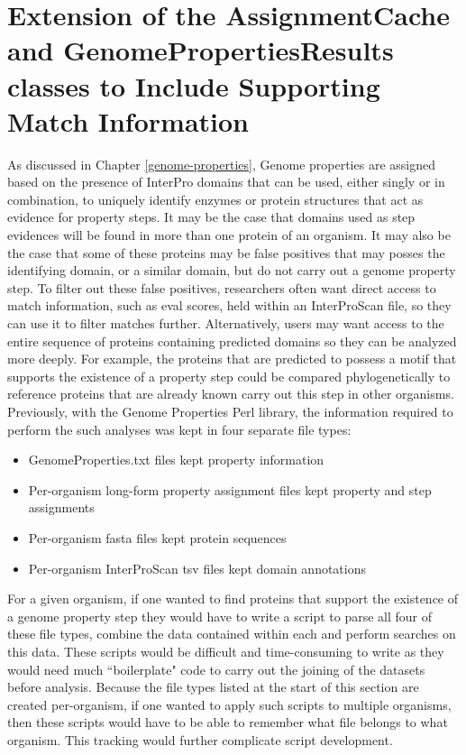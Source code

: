 \section{Extension of the AssignmentCache and GenomePropertiesResults classes to 
Include Supporting Match Information}

As discussed in Chapter \ref{genome-properties}, Genome properties are assigned 
based on the presence of InterPro domains that can be used, either singly or in 
combination, to uniquely identify enzymes or protein structures that act as 
evidence for property steps. It may be the case that domains used as step 
evidences will be found in more than one protein of an organism. It may also be 
the case that some of these proteins may be false positives that may posses the 
identifying domain, or a similar domain, but do not carry out a genome property 
step. To filter out these false positives, researchers often want direct access 
to match information, such as \gls{eval} scores, held within an InterProScan 
file, so they can use it to filter matches further. Alternatively, users may 
want access to the entire sequence of proteins containing predicted domains so 
they can be analyzed more deeply. For example, the proteins that are predicted 
to possess a motif that supports the existence of a property step could be 
compared phylogenetically to reference proteins that are already known carry out 
this step in other organisms. Previously, with the Genome Properties Perl 
library, the information required to perform the such analyses was kept in four 
separate file types:

\begin{itemize}
\item GenomeProperties.txt files kept property information
\item Per-organism long-form property assignment files kept property and step 
assignments
\item Per-organism \gls{fasta} files \cite{pearson19905} kept protein sequences 
\item  Per-organism InterProScan \gls{tsv} files kept domain annotations 
\end{itemize}

For a given organism, if one wanted to find proteins that support the existence 
of a genome property step they would have to write a script to parse all four of 
these file types, combine the data contained within each and perform searches on 
this data. These scripts would be difficult and time-consuming to write as they 
would need much ``boilerplate" code to carry out the joining of the datasets 
before analysis. Because the file types listed at the start of this section are 
created per-organism, if one wanted to apply such scripts to multiple organisms, 
then these scripts would have to be able to remember what file belongs to what 
organism. This tracking would further complicate script development.


